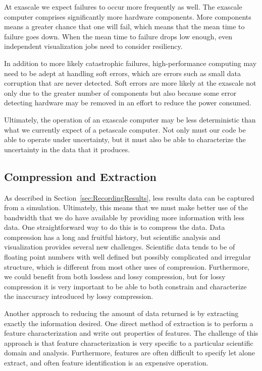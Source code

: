 \documentclass[conference]{IEEEtran}
\begin{document}
At exascale we expect failures to occur more frequently as well.  The
exascale computer comprises significantly more hardware components.  More
components means a greater chance that one will fail, which means that the
mean time to failure goes down.  When the mean time to failure drops low
enough, even independent visualization jobs need to consider resiliency.

In addition to more likely catastrophic failures, high-performance
computing may need to be adept at handling soft errors, which are errors
such as small data corruption that are never detected.  Soft errors are
more likely at the exascale not only due to the greater number of
components but also because some error detecting hardware may be removed in
an effort to reduce the power consumed.

Ultimately, the operation of an exascale computer may be less deterministic
than what we currently expect of a petascale computer.  Not only must our
code be able to operate under uncertainty, but it must also be able to
characterize the uncertainty in the data that it produces.

\subsection{Compression and Extraction}

\noindent
As described in Section~\ref{sec:RecordingResults}, less results data can
be captured from a simulation.  Ultimately, this means that we must make
better use of the bandwidth that we do have available by providing more
information with less data.  One straightforward way to do this is to
compress the data.  Data compression has a long and fruitful history, but
scientific analysis and visualization provides several new challenges.
Scientific data tends to be of floating point numbers with well defined but
possibly complicated and irregular structure, which is different from most
other uses of compression.  Furthermore, we could benefit from both
lossless and lossy compression, but for lossy compression it is very
important to be able to both constrain and characterize the inaccuracy
introduced by lossy compression.

Another approach to reducing the amount of data returned is by extracting
exactly the information desired.  One direct method of extraction is to
perform a feature characterization and write out properties of features.
The challenge of this approach is that feature characterization is very
specific to a particular scientific domain and analysis.  Furthermore,
features are often difficult to specify let alone extract, and often feature
identification is an expensive operation.
\end{document}
